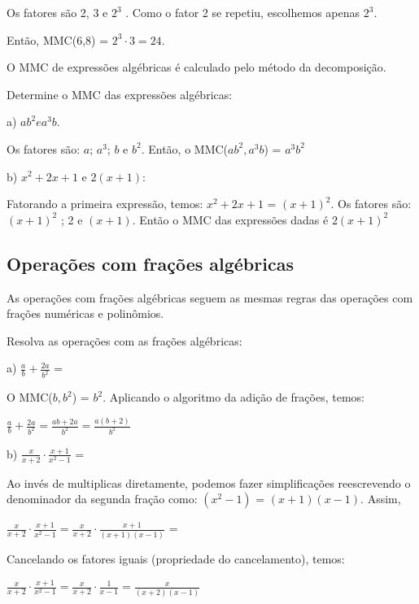 Os fatores são 2, 3 e $2^3$ . Como o fator 2 se repetiu, escolhemos apenas $2^3$. 

Então, MMC(6,8) =  $2^3 \cdot 3  = 24$.

O MMC de expressões algébricas é calculado pelo método da decomposição.

\begin{texemplo}
Determine o MMC das expressões algébricas:

a) $ab^2 e a^3b$.

Os fatores são: $a$; $a^3$; $b$ e $b^2$. Então, o MMC($ab^2, a^3b$) = $a^3b^2$

b) $x^2+2x+1$ e $2(x+1)$:

Fatorando a primeira expressão, temos: $x^2+2x+1$ = $(x + 1)^2$. 
Os fatores são: $(x + 1)^2$ ; 2 e $(x+1)$. Então o MMC das expressões dadas é $2(x + 1)^2$ \qedsymbol{}

\end{texemplo}

\subsection{Operações com frações algébricas}

As operações com frações algébricas seguem as mesmas regras das operações com frações numéricas e polinômios.

\begin{texemplo}
Resolva as operações com as frações algébricas:

{\large a) $\frac{a}{b}+\frac{2a}{b^2}$ =}

O MMC($b,b^2$) = $b^2$. Aplicando o algoritmo da adição de frações, temos:

\begin{center}{\large
$\frac{a}{b}+\frac{2a}{b^2}=\frac{ab+2a}{b^2}=\frac{a(b+2)}{b^2}$
}\end{center}

{\large b) $\frac{x}{x+2} \cdot \frac{x+1}{x^2-1}$ =}

Ao invés de multiplicas diretamente, podemos fazer simplificações reescrevendo o denominador da segunda fração como: $(x^2 - 1)$ = $(x+1)(x-1)$. Assim,

\begin{center}{\large
$\frac{x}{x+2} \cdot \frac{x+1}{x^2-1} = \frac{x}{x+2} \cdot \frac{x+1}{(x+1)(x-1)}$ =
}\end{center}

Cancelando os fatores iguais (propriedade do cancelamento), temos:

\begin{center}{\large
$\frac{x}{x+2} \cdot \frac{x+1}{x^2-1} = \frac{x}{x+2} \cdot \frac{1}{x-1} = \frac{x}{(x+2)(x-1)}$ ~~~~
}\qedsymbol{}\end{center}
\end{texemplo}

